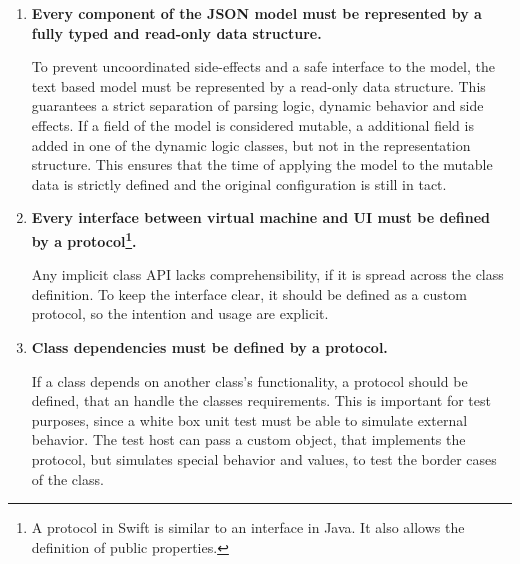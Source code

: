 \begin{enumerate}
	
\item \textbf{Every component of the \ac{JSON} model must be represented by a fully typed and read-only data structure.}

To prevent uncoordinated side-effects and a safe interface to the model, the text based model must be represented by a read-only data structure.
This guarantees a strict separation of parsing logic, dynamic behavior and side effects.
If a field of the model is considered mutable, a additional field is added in one of the dynamic logic classes, but not in the representation structure.
This ensures that the time of applying the model to the mutable data is strictly defined and the original configuration is still in tact.

\item \textbf{Every interface between virtual machine and \ac{UI} must be defined by a protocol\footnote{A protocol in Swift is similar to an interface in Java. It also allows the definition of public properties.}.}

Any implicit class \ac{API} lacks comprehensibility, if it is spread across the class definition.
To keep the interface clear, it should be defined as a custom protocol, so the intention and usage are explicit.

\item \textbf{Class dependencies must be defined by a protocol.}

If a class depends on another class's functionality, a protocol should be defined, that an handle the classes requirements.
This is important for test purposes, since a white box unit test must be able to simulate external behavior.
The test host can pass a custom object, that implements the protocol, but simulates special behavior and values, to test the border cases of the class.

\end{enumerate}






















